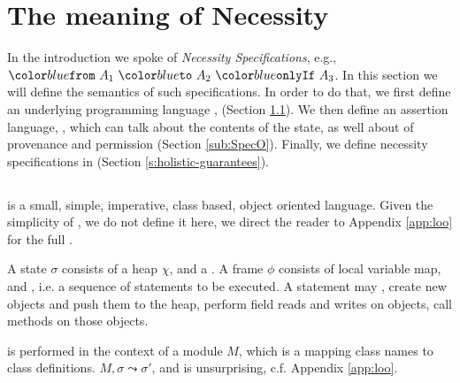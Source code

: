 \section{The meaning of Necessity}
\label{s:semantics}

In the introduction we spoke of \emph{Necessity Specifications}, e.g., $\onlyIf {A_1} {A_2} {A_3}$. 
In this section we will define the semantics of such specifications.
In order to do that, we first define 
an underlying programming language \Loo, (Section \ref{sub:Loo}).
We then  define an assertion language, \SpecO,  which can talk about
 the contents of the state, as well about 
  of provenance and permission (Section \ref{sub:SpecO}).
Finally, we define necessity specifications in \Chainmail (Section \ref{s:holistic-guarantees}).



\subsection{\Loo}
\label{sub:Loo} 
 \Loo is a small, simple, imperative,
class based, object oriented language. 
Given the simplicity of \Loo, we do not
define it here,  we direct the reader to Appendix \ref{app:loo} for 
the full . %

A \Loo state $\sigma$ consists of a 
heap $\chi$, and a .
A frame $\phi$ consists of
local variable map, and , i.e. a sequence of statements to be executed.
 A statement may , create new objects and push them to the heap, 
perform field reads and writes on objects,  
 call methods on those objects. 

 is performed in the context of a module $M$,
which is a mapping
 class names to class definitions. 
  $M, \sigma \leadsto \sigma'$, and is
unsurprising,  c.f. Appendix \ref{app:loo}.
 

